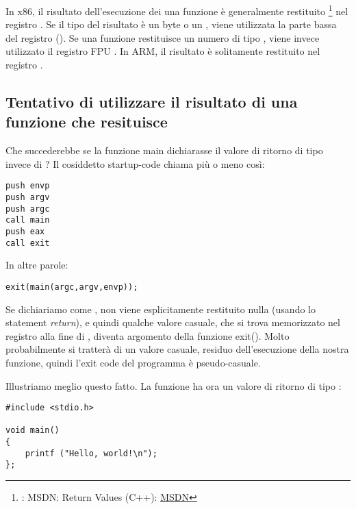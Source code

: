 

In x86, il risultato dell'esecuzione dei una funzione è generalmente restituito
\footnote{\Seealso: MSDN: Return Values (C++): \href{http://msdn.microsoft.com/en-us/library/7572ztz4.aspx}{MSDN}}
nel registro \EAX. 
Se il tipo del risultato è un byte o un \Tchar, viene utilizzata la parte bassa del registro \EAX (\AL). 
Se una funzione restituisce un numero di tipo \Tfloat, viene invece utilizzato il registro FPU .
In ARM, il risultato è solitamente restituito nel registro .

\subsection{Tentativo di utilizzare il risultato di una funzione che resituisce \Tvoid}
\label{UseResultOfVoidFunc}

Che succederebbe se la funzione main dichiarasse il valore di ritorno di tipo \Tvoid invece di \Tint?
Il cosiddetto startup-code chiama \main più o meno così:

\begin{lstlisting}[style=customasmx86]
push envp
push argv
push argc
call main
push eax
call exit
\end{lstlisting}

In altre parole:

\begin{lstlisting}[style=customc]
exit(main(argc,argv,envp));
\end{lstlisting}

Se dichiariamo \main come \Tvoid, non viene esplicitamente restituito nulla  (usando lo statement \emph{return}),
e quindi qualche valore casuale, che si trova memorizzato nel registro \EAX alla fine di \main, diventa argomento della funzione exit().
Molto probabilmente si tratterà di un valore casuale, residuo dell'esecuzione della nostra funzione, quindi l'exit code del programma 
è pseudo-casuale.
\par
Illustriamo meglio questo fatto. 
La funzione \main ha ora un valore di ritorno di tipo \Tvoid:

\begin{lstlisting}[style=customc]
#include <stdio.h>

void main()
{
	printf ("Hello, world!\n");
};
\end{lstlisting}

